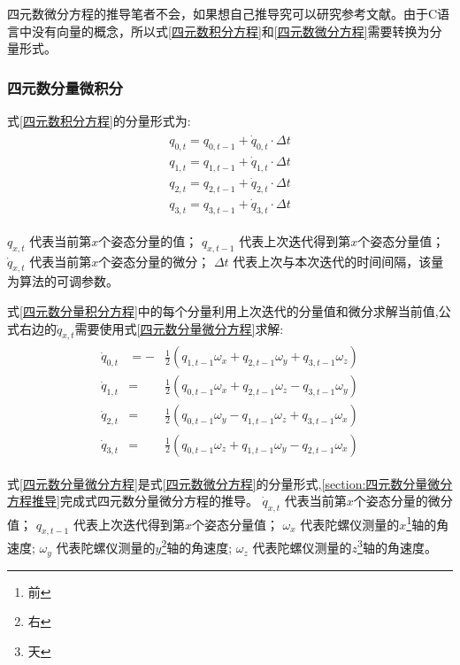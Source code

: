 \documentclass[12pt,a4paper]{article}
\renewcommand{\citet}[1]{\textsuperscript{\cite{#1}}}
\begin{document}
四元数微分方程的推导笔者不会，如果想自己推导究可以研究参考文献\citet{四元数微分方程的推导}。由于C语言中没有向量的概念，所以式\ref{四元数积分方程}和\ref{四元数微分方程}需要转换为分量形式。
\subsubsection{四元数分量微积分}
式\ref{四元数积分方程}的分量形式为:
\begin{eqnarray}\label{四元数分量积分方程}
    \begin{split}
        q_{0,t} = q_{0,t-1} + \dot{q}_{0,t} \cdot \Delta t \\ 
        q_{1,t} = q_{1,t-1} + \dot{q}_{1,t} \cdot \Delta t \\
        q_{2,t} = q_{2,t-1} + \dot{q}_{2,t} \cdot \Delta t \\
        q_{3,t} = q_{3,t-1} + \dot{q}_{3,t} \cdot \Delta t
    \end{split}
\end{eqnarray} 

$q_{x,t}$       代表当前第$x$个姿态分量的值；
$q_{x,t-1}$     代表上次迭代得到第$x$个姿态分量值；
$\dot{q}_{x,t}$ 代表当前第$x$个姿态分量的微分；
$\Delta t$      代表上次与本次迭代的时间间隔，该量为算法的可调参数。

式\ref{四元数分量积分方程}中的每个分量利用上次迭代的分量值和微分求解当前值,公式右边的$\dot{q}_{x,t}$需要使用式\ref{四元数分量微分方程}求解:
\begin{eqnarray}\label{四元数分量微分方程}
    \begin{split}
        \dot{q}_{0,t}&=- &\frac{1}{2}(q_{1,t-1}\omega_x+q_{2,t-1}\omega_y+q_{3,t-1}\omega_z) \\
        \dot{q}_{1,t}&=  &\frac{1}{2}(q_{0,t-1}\omega_x+q_{2,t-1}\omega_z-q_{3,t-1}\omega_y) \\
        \dot{q}_{2,t}&=  &\frac{1}{2}(q_{0,t-1}\omega_y-q_{1,t-1}\omega_z+q_{3,t-1}\omega_x) \\
        \dot{q}_{3,t}&=  &\frac{1}{2}(q_{0,t-1}\omega_z+q_{1,t-1}\omega_y-q_{2,t-1}\omega_x)
    \end{split}
\end{eqnarray} 

式\ref{四元数分量微分方程}是式\ref{四元数微分方程}的分量形式,\ref{section:四元数分量微分方程推导}完成式四元数分量微分方程的推导。
$\dot{q}_{x,t}$ 代表当前第$x$个姿态分量的微分值； 
$q_{x,t-1}$     代表上次迭代得到第$x$个姿态分量值；
$\omega_x$      代表陀螺仪测量的$x$\footnote{前}轴的角速度;
$\omega_y$      代表陀螺仪测量的$y$\footnote{右}轴的角速度;
$\omega_z$      代表陀螺仪测量的$z$\footnote{天}轴的角速度。
\end{document}

